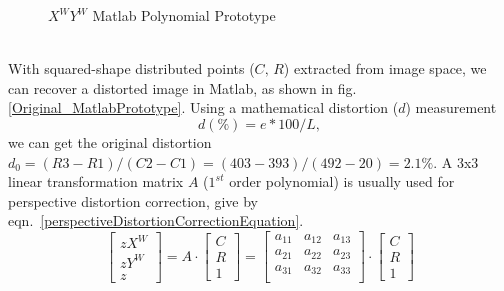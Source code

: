 %
\begin{figure}[!t]
\hspace*{-0.3cm}
\centering
{}
{}

{}
%
\caption{\(X^W\)\(Y^W\) Matlab Polynomial Prototype}
\label{MatlabPrototpyeOfHighOrder}
\end{figure}%
%
\\\indent
With squared-shape distributed points (\(C,\, R\)) extracted from image space, we can recover a distorted image in Matlab, as shown in fig.\ref{Original_MatlabPrototype}. Using a mathematical distortion (\(d\)) measurement \cite{distortionMeasurement_2012}
%
\begin{equation}
d (\%)=  e*100/L ,
\label{secondOrderPolynomial}
\end{equation}%
%
\noindent
we can get the original distortion \(d_0 = (R3 - R1) / (C2 -C1) = (403 - 393) / (492 - 20) = 2.1\%\). A 3x3 linear transformation matrix \(A\) (\(1^{st}\) order polynomial) is usually used for perspective distortion correction, give by eqn.~\ref{perspectiveDistortionCorrectionEquation}.
%
\begin{equation}
%
\left[ \begin{array}{c} %
zX^W \\ zY^W \\ z \end{array} \right] %
= %
A\cdot \left[ \begin{array}{c} %
C \\ R \\ 1 \end{array} \right] %
= %
\begin{bmatrix} 
a_{11} & a_{12} & a_{13} \\
a_{21} & a_{22} & a_{23} \\
a_{31} & a_{32} & a_{33} \\
\end{bmatrix}%
\cdot \left[ \begin{array}{c} %
C \\ R \\ 1 \end{array} \right] %
%
\label{perspectiveDistortionCorrectionEquation}
\end{equation}%
